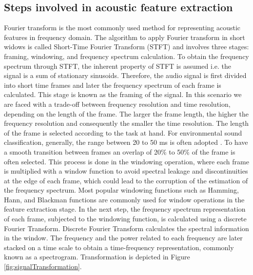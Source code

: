 \subsection{Steps involved in acoustic feature extraction}
\label{chapter:backroundStepsInvolved}
Fourier transform is the most commonly used method for representing acoustic features in frequency domain\cite{DCASE2020Workshop, DCASE2019Workshop, dcase2022}. The algorithm to apply Fourier transform in short widows is called Short-Time Fourier Transform (STFT) and involves three stages: framing, windowing, and frequency spectrum calculation. To obtain the frequency spectrum through STFT, the inherent property of STFT is assumed i.e. the signal is a sum of stationary sinusoids. Therefore, the audio signal is first divided into short time frames and later the frequency spectrum of each frame is calculated. This stage is known as the framing of the signal. In this scenario we are faced with a trade-off between frequency resolution and time resolution, depending on the length of the frame. The larger the frame length, the higher the frequency resolution and consequently the smaller the time resolution. The length of the frame is selected according to the task at hand. For environmental sound classification, generally, the range between 20 to 50 ms is often adopted \cite{mesaros2021sound}. To have a smooth transition between frames an overlap of 20\% to 50\% of the frame is often selected. This process is done in the windowing operation, where each frame is multiplied with a window function to avoid spectral leakage and discontinuities  at the edge of each frame, which could lead to the corruption of the estimation of the frequency spectrum. Most popular windowing functions such as Hamming, Hann, and Blackman functions are commonly used for window operations in the feature extraction stage. In the next step, the frequency spectrum representation of each frame, subjected to the windowing function, is calculated using a discrete Fourier Transform. Discrete Fourier Transform calculates the spectral information in the window. The frequency and the power related to each frequency are later stacked on a time scale to obtain a time-frequency representation, commonly known as a spectrogram. Transformation is depicted in Figure \ref{fig:signalTransformation}. 


